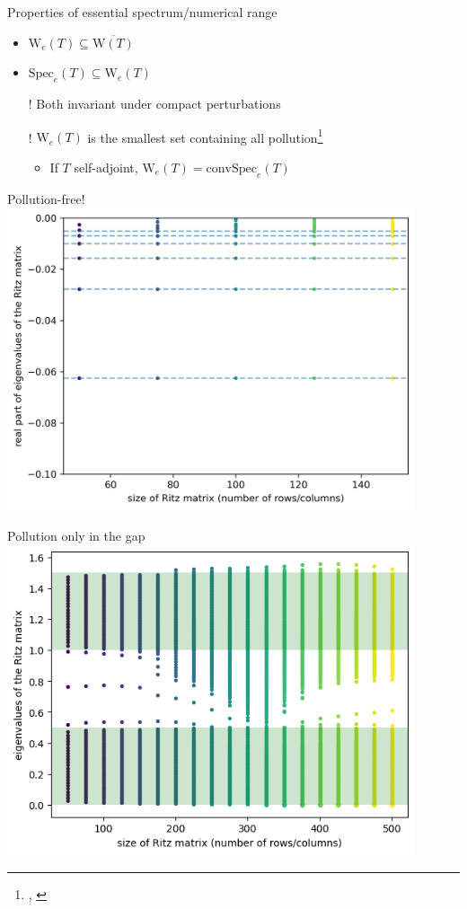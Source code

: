 \documentclass[14pt]{beamer}
\newcommand{\Spec}{\mathrm{Spec}} %
\newcommand{\Num}{\mathrm{W}} %
\begin{document}
\begin{frame}{Properties of essential spectrum/numerical range}
  \begin{itemize}
    \item $\Num_e(T) \subseteq \overline{\Num(T)}$
    \item $\Spec_e(T) \subseteq \Num_e(T)$
    \item[!] Both invariant under compact perturbations
    \item[!] $\Num_e(T)$ is the smallest set containing all pollution\footnote{\textcite{pokrzywa1979method}, \textcite{bogli2020essential}}
      \begin{itemize}
        \item If $T$ self-adjoint, $\Num_e(T) = \mathrm{conv}\Spec_e(T)$
      \end{itemize}
  \end{itemize}
\end{frame}

\begin{frame}{Pollution-free!}
  \includegraphics[width=0.9\textwidth]{hydrogen}
\end{frame}

\begin{frame}{Pollution only in the gap}
  \includegraphics[width=0.9\textwidth]{mult-op-spec}
\end{frame}
\end{document}
